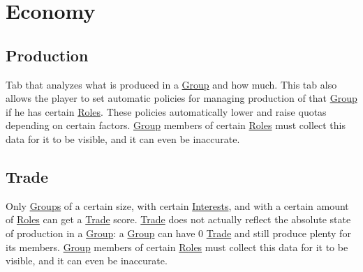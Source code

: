 \documentclass[11pt]{article}
\begin{document}
\section{Economy}
\label{sec:org1edcb03}
\subsection{Production \label{org9bdc7c2} \label{org4e3993f}}
\label{sec:orgb83f792}
Tab that analyzes what is produced in a \hyperref[org3bac9f0]{Group} and how much. This tab also allows the player to set automatic policies for managing production of that \hyperref[org3bac9f0]{Group} if he has certain \hyperref[org080bb13]{Roles}. These policies automatically lower and raise quotas depending on certain factors. \hyperref[org3bac9f0]{Group} members of certain \hyperref[org080bb13]{Roles} must collect this data for it to be visible, and it can even be inaccurate.\\
\subsection{Trade \label{orgdbeaa2d} \label{org65c2311}}
\label{sec:org686c8ce}
Only \hyperref[org21e4d88]{Groups} of a certain size, with certain \hyperref[orgc5a9408]{Interests}, and with a certain amount of \hyperref[org080bb13]{Roles} can get a \hyperref[orgdbeaa2d]{Trade} score. \hyperref[orgdbeaa2d]{Trade} does not actually reflect the absolute state of production in a \hyperref[org3bac9f0]{Group}: a \hyperref[org3bac9f0]{Group} can have 0 \hyperref[orgdbeaa2d]{Trade} and still produce plenty for its members. \hyperref[org3bac9f0]{Group} members of certain \hyperref[org080bb13]{Roles} must collect this data for it to be visible, and it can even be inaccurate.\\
\end{document}
